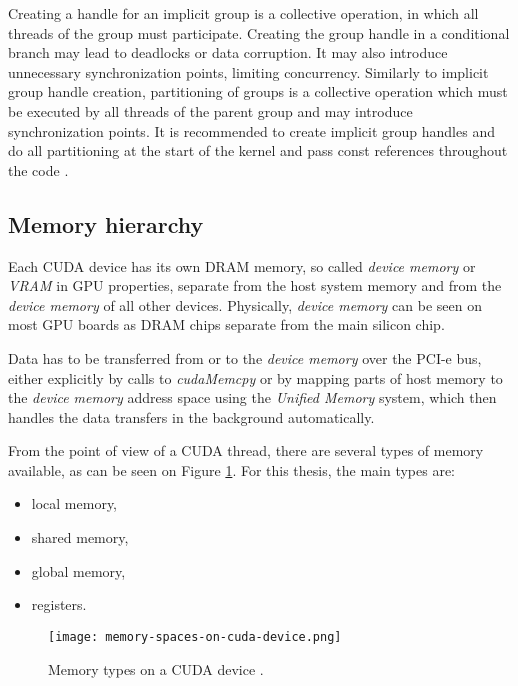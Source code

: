 

Creating a handle for an implicit group is a collective operation, in which all threads of the group must participate. Creating the group handle in a conditional branch may lead to deadlocks or data corruption. It may also introduce unnecessary synchronization points, limiting concurrency. Similarly to implicit group handle creation, partitioning of groups is a collective operation which must be executed by all threads of the parent group and may introduce synchronization points. It is recommended to create implicit group handles and do all partitioning at the start of the kernel and pass const references throughout the code \cite{site:cuda}.

\subsection{Memory hierarchy}
\label{sec:memory_hierarchy}

Each CUDA device has its own DRAM memory, so called \textit{device memory} or \textit{VRAM} in GPU properties, separate from the host system memory and from the \textit{device memory} of all other devices. Physically, \textit{device memory} can be seen on most GPU boards as DRAM chips separate from the main silicon chip.

Data has to be transferred from or to the \textit{device memory} over the PCI-e bus, either explicitly by calls to \textit{cudaMemcpy} or by mapping parts of host memory to the \textit{device memory} address space using the \textit{Unified Memory} system, which then handles the data transfers in the background automatically.

From the point of view of a CUDA thread, there are several types of memory available, as can be seen on Figure \ref{fig:memory_types}. For this thesis, the main types are:

\begin{itemize}
	\item local memory,
	\item shared memory,
	\item global memory,
	\item registers.
\end{itemize}

\begin{figure}[h]
	\centering
	\texttt{[image: memory-spaces-on-cuda-device.png]}
	\caption{Memory types on a CUDA device \citep{site:cuda}.}
	\label{fig:memory_types}
\end{figure}


